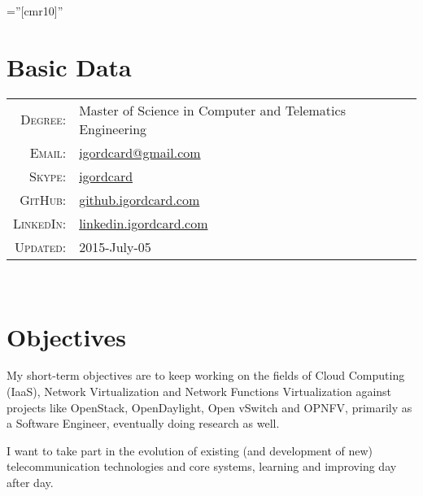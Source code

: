 \documentclass[letter,10pt]{article} %
\begin{document}
\pagestyle{empty} %

\font\fb=''[cmr10]'' %



\par{\bigskip\par} %

\section{Basic Data}

\begin{tabular}{rl}
\textsc{Degree:} & Master of Science in Computer and Telematics Engineering\\
\textsc{Email:} & \href{mailto:igordcard+cv@gmail.com}{igordcard@gmail.com}\\
\textsc{Skype:} & \href{skype:igordcard?add}{igordcard}\\
\textsc{GitHub:} & \href{http://github.igordcard.com}{github.igordcard.com}\\
\textsc{LinkedIn:} & \href{http://linkedin.igordcard.com}{linkedin.igordcard.com}\\
\textsc{Updated:} & 2015-July-05\\
\end{tabular} \\


\section{Objectives}

My short-term objectives are to keep working on the fields of Cloud Computing (IaaS), Network Virtualization and Network Functions Virtualization against projects like OpenStack, OpenDaylight, Open vSwitch and OPNFV, primarily as a Software Engineer, eventually doing research as well.

I want to take part in the evolution of existing (and development of new) telecommunication technologies and core systems, learning and improving day after day. \\
\end{document}
